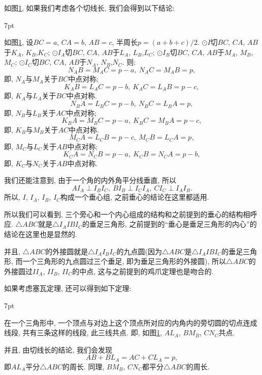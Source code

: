 \documentclass{book}
\newenvironment{theorem}{%
\def\FrameCommand{%
\hspace{1pt}%
{\color{cyan!60!blue}\vrule width 2pt}%
{\color{cyan!10}\vrule width 4pt}%
\colorbox{cyan!10}%
}%
\MakeFramed{\advance\hsize-\width\FrameRestore}%
\noindent\hspace{-4.55pt}%
\begin{adjustwidth}{}{7pt}%
\vspace{2pt}\vspace{2pt}%
}
{%
\vspace{2pt}\end{adjustwidth}\endMakeFramed%
}
\begin{document}
\begin{paracol}{2}
\begin{figure}[thbp]
	\caption{}\label{fig:escenter4}
\end{figure}

如图\ref{fig:escenter4}, 如果我们考虑各个切线长, 我们会得到以下结论:

\begin{theorem}
	\kaishu 如图\ref{fig:escenter4}, 设$ BC=a $, $ CA=b $, $ AB=c $, 半周长$ p=(a+b+c)/2 $. $ \odot I $切$ BC $, $ CA $, $ AB $于$ K_A $, $ K_B $,$ K_C $; $ \odot I_A $切$ BC $, $ CA $, $ AB $于$ L_A $, $ L_B $,$ L_C $; $ \odot I_B $切$ BC $, $ CA $, $ AB $于$ M_A $, $ M_B $,$ M_C $; $ \odot I_C $切$ BC $, $ CA $, $ AB $于$ N_A $, $ N_B $,$ N_C $. 则:
	\[ N_AB=M_AC=p-a,\ N_AC=M_AB=p, \]
	即, $ N_A $与$ M_A $关于$ BC $中点对称; 
	\[ K_AB=L_AC=p-b,\ K_AC=L_AB=p-c, \]
	即, $ K_A $与$ L_A $关于$ BC $中点对称.
	\[ N_BA=L_BC=p-b,\ N_BC=L_BA=p, \]
	即, $ N_B $与$ L_B $关于$ AC $中点对称;
	\[ K_BA=M_BC=p-a,\ K_BC=M_BA=p-c, \]
	即, $ K_B $与$ M_B $关于$ AC $中点对称.
	\[ M_CA=L_CB=p-c,\ M_CB=L_CA=p, \]
	即, $ M_C $与$ L_C $关于$ AB $中点对称;
	\[ K_CA=N_CB=p-a,\ K_CB=N_CA=p-b, \]
	即, $ K_C $与$ N_C $关于$ AB $中点对称.
\end{theorem}

我们还能注意到, 由于一个角的内外角平分线垂直, 所以
\[AI_A\perp I_BI_C,\ BI_B\perp I_CI_A,\ CI_C\perp I_AI_B.\]
所以, $ I $, $ I_A $, $ I_B $, $ I_C $构成一个垂心组, 之前垂心的结论在这里都适用.\par
所以我们可以看到, 三个旁心和一个内心组成的结构和之前提到的垂心的结构相呼应. $ \triangle ABC $就是$ \triangle I_AIBI_C $的垂足三角形, 之前提到的“垂心是垂足三角形的内心”的结论在这里也是显然的.\par
并且, $ \triangle ABC $的外接圆就是$ \triangle I_AI_BI_C $的九点圆(因为$ \triangle ABC $是$ \triangle I_AIBI_C $的垂足三角形, 而一个三角形的九点圆过三个垂足, 即为垂足三角形的外接圆), 所以$ \triangle ABC $的外接圆过$ II_A $, $ II_B $, $ II_C $的中点, 这与之前提到的鸡爪定理也是吻合的.\par
如果考虑塞瓦定理, 还可以得到如下定理:
\begin{theorem}
	\kaishu 在一个三角形中, 一个顶点与对边上这个顶点所对应的内角内的旁切圆的切点连成线段, 共有三条这样的线段, 此三线共点. 即, 如图\ref{fig:escenter4}, $ AL_A $, $ BM_B $, $ CN_C $共点.
\end{theorem}
并且, 由切线长的结论, 我们会发现
\[ AB+BL_A=AC+CL_A=p, \]
即$ AL_A $平分$ \triangle ABC $的周长. 同理, $ BM_B $, $ CN_C $都平分$ \triangle ABC $的周长.
\end{paracol}
\end{document}
